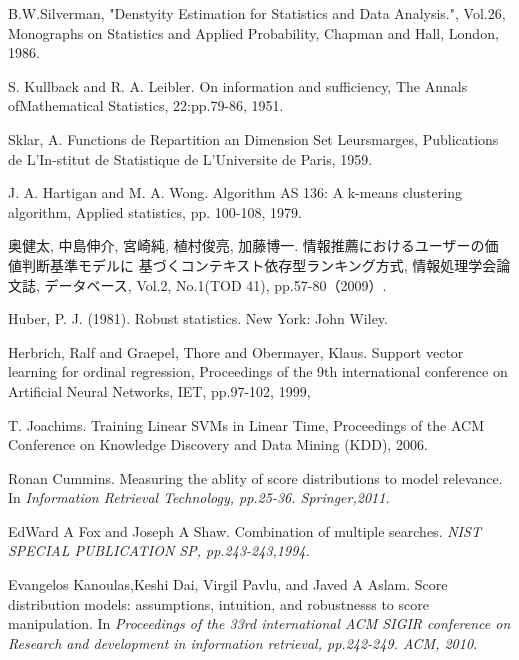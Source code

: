 \begin{thebibliography}{99}
B.W.Silverman,
"Denstyity Estimation for Statistics and Data Analysis.",
Vol.26,
Monographs on Statistics and Applied Probability,
Chapman and Hall,
London,
1986.

S. Kullback and R. A. Leibler.
On information and sufficiency,
The Annals ofMathematical Statistics, 22:pp.79-86, 1951.

Sklar, A.
Functions de Repartition an Dimension Set Leursmarges,
Publications de L’In-stitut de Statistique de L’Universite de Paris, 1959.

J. A. Hartigan and M. A. Wong.
Algorithm AS 136: A k-means clustering algorithm,
Applied statistics, pp. 100-108, 1979.

奥健太, 中島伸介, 宮崎純, 植村俊亮, 加藤博一.
情報推薦におけるユーザーの価値判断基準モデルに
基づくコンテキスト依存型ランキング方式,
情報処理学会論文誌, データベース, Vol.2,
No.1(TOD 41), pp.57-80（2009）.

Huber, P. J. (1981). Robust statistics. New York: John Wiley.

  Herbrich, Ralf and Graepel, Thore and Obermayer, Klaus.
  Support vector learning for ordinal regression,
  Proceedings of the 9th international conference on Artificial Neural Networks,
  IET, pp.97-102, 1999,

T. Joachims.
Training Linear SVMs in Linear Time,
Proceedings of the ACM Conference on Knowledge Discovery and Data Mining (KDD), 2006.

Ronan Cummins.
Measuring the ablity of score distributions to model relevance.
In \it{Information Retrieval Technology},
\rm
pp.25-36.
Springer,2011.

EdWard A Fox and Joseph A Shaw.
Combination of multiple searches.
\it{NIST SPECIAL PUBLICATION SP},
\rm
pp.243-243,1994.

Evangelos Kanoulas,Keshi Dai, Virgil Pavlu, and Javed A Aslam.
Score distribution models: assumptions, intuition, and robustnesss to score manipulation.
In \it{Proceedings of the 33rd international ACM SIGIR conference on Research and development in information retrieval},
\rm
pp.242-249.
ACM,
2010.

\end{thebibliography}
